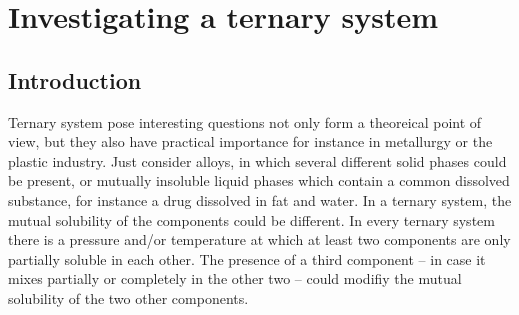 \fancyhead[LO,RE]{\thesection}
\fancyfoot[LE,RO]{\thepage}

\section{Investigating a ternary system}
\subsection{Introduction}

Ternary system pose interesting questions not only form a theoreical point of view, but they also have practical importance for instance in metallurgy or the plastic industry. Just consider alloys, in which several different solid phases could be present, or mutually insoluble liquid phases which contain a common dissolved substance, for instance a drug dissolved in fat and water. In a ternary system, the mutual solubility of the components could be different. In every ternary system there is a pressure and/or temperature at which at least two components are only partially soluble in each other. The presence of a third component -- in case it mixes partially or completely in the other two -- could modifiy the mutual solubility of the two other components.

